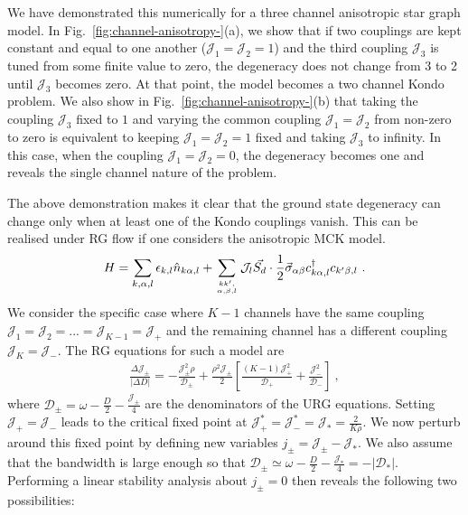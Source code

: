 \documentclass[reprint,prb,superscriptaddress]{revtex4-2}
\begin{document}
We have demonstrated this numerically for a three channel anisotropic star graph model.
In Fig.~\ref{fig:channel-anisotropy-}(a), we show that if two couplings are kept constant and equal to one another (${\mathcal{J}}_1={\mathcal{J}}_2=1$) and the third coupling ${\mathcal{J}}_3$ is tuned from some finite value to zero, the degeneracy does not change from 3 to 2 until \(\mathcal{J}_3\) becomes zero.
At that point, the model becomes a two channel Kondo problem.
We also show in Fig.~\ref{fig:channel-anisotropy-}(b) that taking the coupling ${\mathcal{J}}_3$ fixed to $1$ and varying the common coupling ${\mathcal{J}}_1={\mathcal{J}}_2$ from non-zero to zero is equivalent to keeping ${\mathcal{J}}_1={\mathcal{J}}_2=1$ fixed and taking ${\mathcal{J}}_3$ to infinity. In this case, when the coupling ${\mathcal{J}}_1={\mathcal{J}}_2=0$, the degeneracy becomes one and reveals the single channel nature of the problem.

The above demonstration makes it clear that the ground state degeneracy can change only when at least one of the Kondo couplings vanish. This can be realised under RG flow if one considers the anisotropic MCK model.
\begin{align}
	H = \sum_{k,\alpha,l}\epsilon_{k,l} \hat n_{k\alpha,l} + \sum_{kk^\prime,\atop{\alpha,\beta,l}}{\mathcal{J}}_l \vec{S_d}\cdot\frac{1}{2}\vec{\sigma}_{\alpha\beta}c_{k\alpha,l}^\dagger c_{k^\prime\beta, l}~.
\end{align}
We consider the specific case where \(K-1\) channels have the same coupling \({\mathcal{J}}_1 = {\mathcal{J}}_2 = ... = {\mathcal{J}}_{K-1} = {\mathcal{J}}_+\) and the remaining channel has a different coupling \({\mathcal{J}}_K = {\mathcal{J}}_-\). The RG equations for such a model are
\begin{align}
	\frac{\Delta {\mathcal{J}}_\pm}{|\Delta D|} = -\frac{{\mathcal{J}}_\pm^2 \rho}{\mathcal{D}_\pm} + \frac{\rho^2 {\mathcal{J}}_\pm}{2}\left[\frac{(K-1){\mathcal{J}}_+^2}{\mathcal{D}_+} + \frac{{\mathcal{J}}_-^2}{\mathcal{D}_-}\right]~,
\end{align}
where \(\mathcal{D}_\pm = \omega - \frac{D}{2} - \frac{{\mathcal{J}}_\pm}{4}\) are the denominators of the URG equations.
Setting \({\mathcal{J}}_+ = {\mathcal{J}}_-\) leads to the critical fixed point at \({\mathcal{J}}_+^* = {\mathcal{J}}_-^* = {\mathcal{J}}_* = \frac{2}{K \rho}\). We now perturb around this fixed point by defining new variables \(j_\pm = {\mathcal{J}}_\pm - {\mathcal{J}}_*\). We also assume that the bandwidth is large enough so that \(\mathcal{D}_\pm \simeq \omega - \frac{D}{2} - \frac{{\mathcal{J}}_*}{4} = -|\mathcal{D}_*|\). Performing a linear stability analysis about \(j_\pm=0\) then reveals the following two possibilities:
\end{document}
